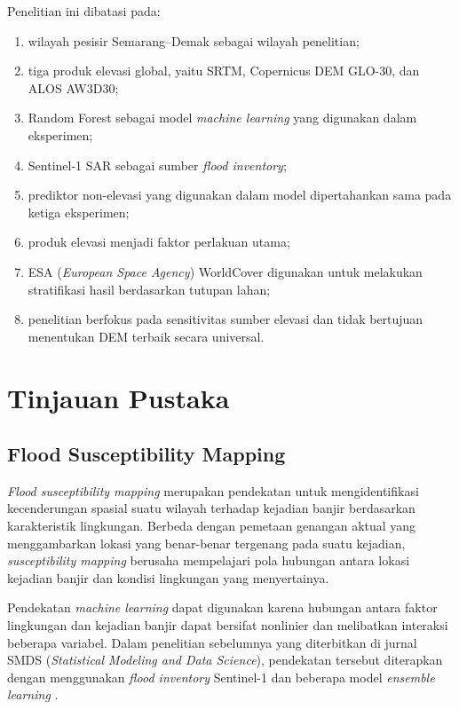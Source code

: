 \documentclass[12pt]{article}
\begin{document}
Penelitian ini dibatasi pada:

\begin{enumerate}
\item wilayah pesisir Semarang--Demak sebagai wilayah penelitian;
\item tiga produk elevasi global, yaitu SRTM, Copernicus DEM GLO-30, dan
ALOS AW3D30;
\item Random Forest sebagai model \textit{machine learning} yang digunakan
dalam eksperimen;
\item Sentinel-1 SAR sebagai sumber \textit{flood inventory};
\item prediktor non-elevasi yang digunakan dalam model dipertahankan sama
pada ketiga eksperimen;
\item produk elevasi menjadi faktor perlakuan utama;
\item ESA (\textit{European Space Agency}) WorldCover digunakan untuk
melakukan stratifikasi hasil
berdasarkan tutupan lahan;
\item penelitian berfokus pada sensitivitas sumber elevasi dan tidak
bertujuan menentukan DEM terbaik secara universal.
\end{enumerate}


\clearpage
\section{Tinjauan Pustaka}

\subsection{Flood Susceptibility Mapping}

\textit{Flood susceptibility mapping} merupakan pendekatan untuk
mengidentifikasi kecenderungan spasial suatu wilayah terhadap kejadian banjir
berdasarkan karakteristik lingkungan. Berbeda dengan pemetaan genangan
aktual yang menggambarkan lokasi yang benar-benar tergenang pada suatu
kejadian, \textit{susceptibility mapping} berusaha mempelajari pola hubungan
antara lokasi kejadian banjir dan kondisi lingkungan yang menyertainya.

Pendekatan \textit{machine learning} dapat digunakan karena hubungan antara
faktor lingkungan dan kejadian banjir dapat bersifat nonlinier dan melibatkan
interaksi beberapa variabel. Dalam penelitian sebelumnya yang diterbitkan di
jurnal SMDS (\textit{Statistical Modeling and Data Science}), pendekatan
tersebut diterapkan dengan menggunakan \textit{flood inventory} Sentinel-1
dan beberapa model \textit{ensemble learning} \cite{hakim2026}.
\end{document}
